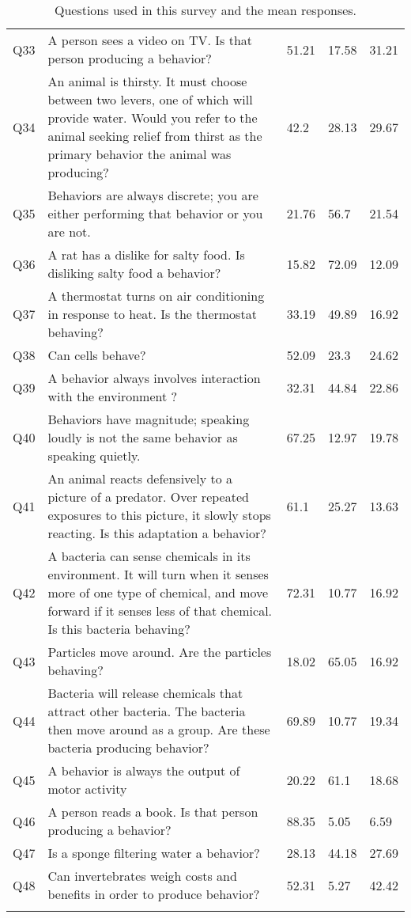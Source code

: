 \begin{longtable}{p{1cm} p{12cm} || p{1cm} p{1cm} p{1cm}}
Q33 & A person sees a video on TV. Is that person producing a behavior? & 51.21 & 17.58 & 31.21 \\ 
Q34 & An animal is thirsty. It must choose between two levers, one of which will provide water. Would you refer to the animal seeking relief from thirst as the primary behavior the animal was producing? & 42.2 & 28.13 & 29.67 \\ 
Q35 & Behaviors are always discrete; you are either performing that behavior or you are not. & 21.76 & 56.7 & 21.54 \\ 
Q36 & A rat has a dislike for salty food. Is disliking salty food a behavior? & 15.82 & 72.09 & 12.09 \\ 
Q37 & A thermostat turns on air conditioning in response to heat. Is the thermostat behaving? & 33.19 & 49.89 & 16.92 \\ 
Q38 & Can cells behave? & 52.09 & 23.3 & 24.62 \\ 
Q39 & A behavior always involves interaction with the environment ? & 32.31 & 44.84 & 22.86 \\ 
Q40 & Behaviors have magnitude; speaking loudly is not the same behavior as speaking quietly. & 67.25 & 12.97 & 19.78 \\ 
Q41 & An animal reacts defensively to a picture of a predator. Over repeated exposures to this picture, it slowly stops reacting. Is this adaptation a behavior? & 61.1 & 25.27 & 13.63 \\ 
Q42 & A bacteria can sense chemicals in its environment. It will turn when it senses more of one type of chemical, and move forward if it senses less of that chemical. Is this bacteria behaving? & 72.31 & 10.77 & 16.92 \\ 
Q43 & Particles move around. Are the particles behaving? & 18.02 & 65.05 & 16.92 \\ 
Q44 & Bacteria will release chemicals that attract other bacteria. The bacteria then move around as a group. Are these bacteria producing behavior? & 69.89 & 10.77 & 19.34 \\ 
Q45 & A behavior is always the output of motor activity & 20.22 & 61.1 & 18.68 \\ 
Q46 & A person reads a book. Is that person producing a behavior? & 88.35 & 5.05 & 6.59 \\ 
Q47 & Is a sponge filtering water a behavior? & 28.13 & 44.18 & 27.69 \\ 
Q48 & Can invertebrates weigh costs and benefits in order to produce behavior? & 52.31 & 5.27 & 42.42 \\ 
\hline
\caption{Questions used in this survey and the mean responses.}
\end{longtable}

